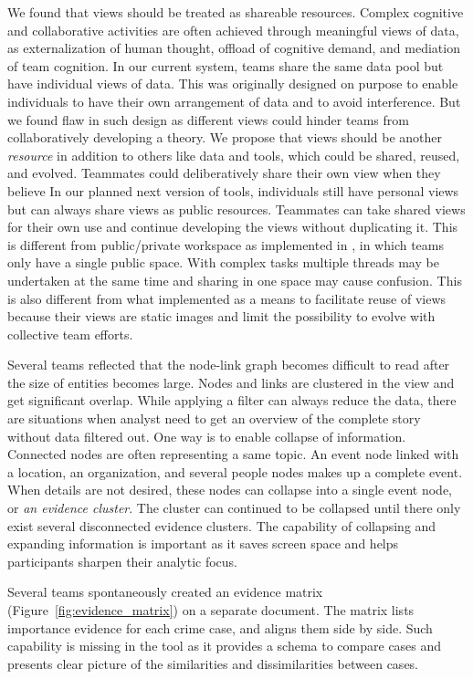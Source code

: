 We found that views should be treated as shareable resources. Complex cognitive and collaborative activities are often achieved through meaningful views of data, as externalization of human thought, offload of cognitive demand, and mediation of team cognition. In our current system, teams share the same data pool but have individual views of data. This was originally designed on purpose to enable individuals to have their own arrangement of data and to avoid interference. But we found flaw in such design as different views could hinder teams from collaboratively developing a theory. We propose that views should be another \emph{resource} in addition to others like data and tools, which could be shared, reused, and evolved. Teammates could deliberatively share their own view when they believe In our planned next version of tools, individuals still have personal views but can always share views as public resources. Teammates can take shared views for their own use and continue developing the views without duplicating it. This is different from public/private workspace as implemented in \cite{Convertino2011}, in which teams only have a single public space. With complex tasks multiple threads may be undertaken at the same time and sharing in one space may cause confusion. This is also different from what \cite{Nobarany2012} implemented as a means to facilitate reuse of views because their views are static images and limit the possibility to evolve with collective team efforts.


Several teams reflected that the node-link graph becomes difficult to read after the size of entities becomes large. Nodes and links are clustered in the view and get significant overlap. While applying a filter can always reduce the data, there are situations when analyst need to get an overview of the complete story without data filtered out. One way is to enable collapse of information. Connected nodes are often representing a same topic. An event node linked with a location, an organization, and several people nodes makes up a complete event. When details are not desired, these nodes can collapse into a single event node, or \emph{an evidence cluster}. The cluster can continued to be collapsed until there only exist several disconnected evidence clusters. The capability of collapsing and expanding information is important as it saves screen space and helps participants sharpen their analytic focus.

Several teams spontaneously created an evidence matrix (Figure~\ref{fig:evidence_matrix}) on a separate document. The matrix lists importance evidence for each crime case, and aligns them side by side. Such capability is missing in the tool as it provides a schema to compare cases and presents clear picture of the similarities and dissimilarities between cases. 

